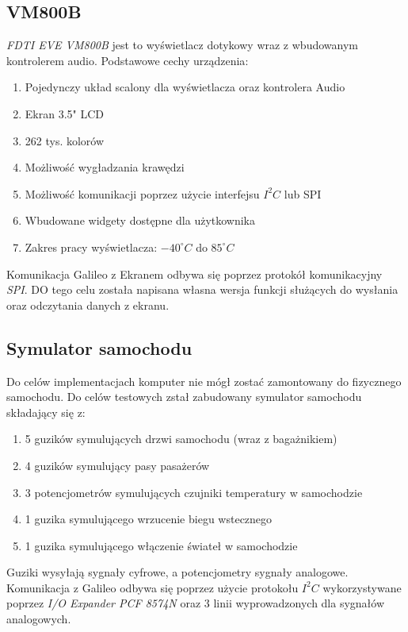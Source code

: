 \documentclass{xmgr}
\begin{document}
\subsection{VM800B}
\emph{FDTI EVE VM800B} jest to wyświetlacz dotykowy wraz z wbudowanym kontrolerem audio. Podstawowe cechy urządzenia\cite{FTDI}:
\begin{enumerate}
	\item Pojedynczy układ scalony dla wyświetlacza oraz kontrolera Audio
	\item Ekran 3.5" LCD
	\item 262 tys. kolorów
	\item Możliwość wygładzania krawędzi
	\item Możliwość komunikacji poprzez użycie interfejsu $I^2C$ lub SPI
	\item Wbudowane widgety dostępne dla użytkownika
	\item Zakres pracy wyświetlacza: $-40^{\circ} C$ do $85^{\circ} C$ 
\end{enumerate}

Komunikacja Galileo z Ekranem odbywa się poprzez protokół komunikacyjny \emph{SPI}. DO tego celu została napisana własna wersja funkcji służących do wysłania oraz odczytania danych z ekranu.

\subsection{Symulator samochodu}
Do celów implementacjach komputer nie mógł zostać zamontowany do fizycznego samochodu. Do celów testowych zstał zabudowany symulator samochodu składający się z:
\begin{enumerate}
	\item 5 guzików symulujących drzwi samochodu (wraz z bagażnikiem)
	\item 4 guzików symulujący pasy pasażerów
	\item 3 potencjometrów symulujących czujniki temperatury w samochodzie
	\item 1 guzika symulującego wrzucenie biegu wstecznego
	\item 1 guzika symulującego włączenie świateł w samochodzie
\end{enumerate}
Guziki wysyłają sygnały cyfrowe, a potencjometry sygnały analogowe. Komunikacja z Galileo odbywa się poprzez użycie protokołu $I^2C$ wykorzystywane poprzez \emph{I/O Expander PCF 8574N} oraz 3 linii wyprowadzonych dla sygnałów analogowych.

\end{document}
